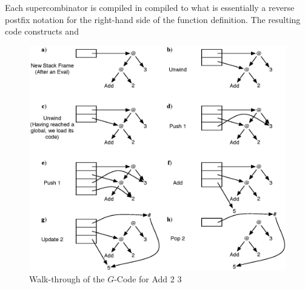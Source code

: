     Each supercombinator is compiled in compiled to what is essentially a
reverse postfix notation for the right-hand side of the function definition.  
The resulting code constructs and 
\begin{figure}[h!]
  \centering
  \includegraphics[scale=0.55]{Background/figures/AddExample.eps}
  \caption[G-Code execution example]
   {Walk-through of the \(G\)-Code for Add 2 3}
  \label{example:gCode}
\end{figure}

